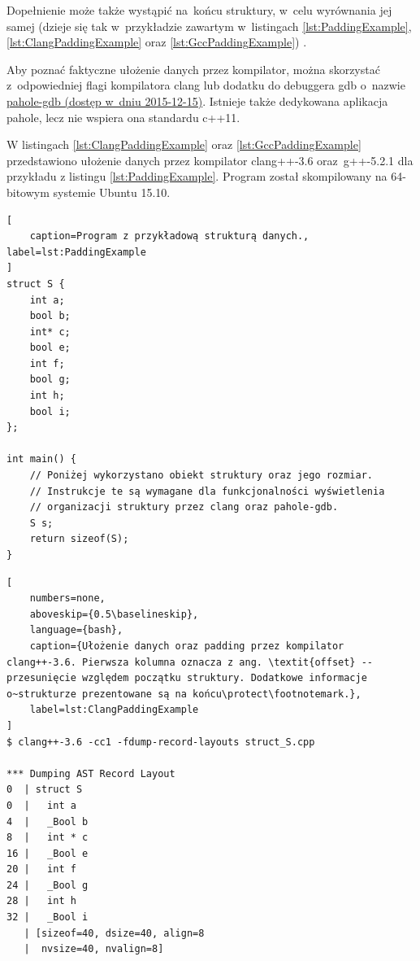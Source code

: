 Dopełnienie może także wystąpić na~końcu struktury, w~celu wyrównania jej samej (dzieje się tak w~przykładzie zawartym w~listingach \ref{lst:PaddingExample}, \ref{lst:ClangPaddingExample} oraz \ref{lst:GccPaddingExample}) \cite{IntelDataAlignment}.

Aby poznać faktyczne ułożenie danych przez kompilator, można skorzystać z~odpowiedniej flagi kompilatora clang lub dodatku do debuggera gdb o~nazwie \href{https://github.com/PhilArmstrong/pahole-gdb}{pahole-gdb (dostęp w~dniu 2015-12-15)}. Istnieje także dedykowana aplikacja pahole, lecz nie wspiera ona standardu c++11.

W listingach \ref{lst:ClangPaddingExample} oraz \ref{lst:GccPaddingExample} przedstawiono ułożenie danych przez kompilator clang++-3.6  oraz~\mbox{g++-5.2.1} dla przykładu z listingu \ref{lst:PaddingExample}. Program został skompilowany na 64-bitowym systemie Ubuntu 15.10.

\clearpage %

\begin{lstlisting}[
    caption=Program z przykładową strukturą danych., label=lst:PaddingExample
]
struct S {
    int a;
    bool b;
    int* c;
    bool e;
    int f;
    bool g;
    int h;
    bool i;
};

int main() {
    // Poniżej wykorzystano obiekt struktury oraz jego rozmiar.
    // Instrukcje te są wymagane dla funkcjonalności wyświetlenia 
    // organizacji struktury przez clang oraz pahole-gdb.
    S s;
    return sizeof(S);
}
\end{lstlisting}


\begin{lstlisting}[
    numbers=none,
    aboveskip={0.5\baselineskip},
    language={bash},
    caption={Ułożenie danych oraz padding przez kompilator clang++-3.6. Pierwsza kolumna oznacza z ang. \textit{offset} -- przesunięcie względem początku struktury. Dodatkowe informacje o~strukturze prezentowane są na końcu\protect\footnotemark.}, 
    label=lst:ClangPaddingExample
]
$ clang++-3.6 -cc1 -fdump-record-layouts struct_S.cpp 

*** Dumping AST Record Layout
0  | struct S
0  |   int a
4  |   _Bool b
8  |   int * c
16 |   _Bool e
20 |   int f
24 |   _Bool g
28 |   int h
32 |   _Bool i
   | [sizeof=40, dsize=40, align=8
   |  nvsize=40, nvalign=8]
\end{lstlisting}


